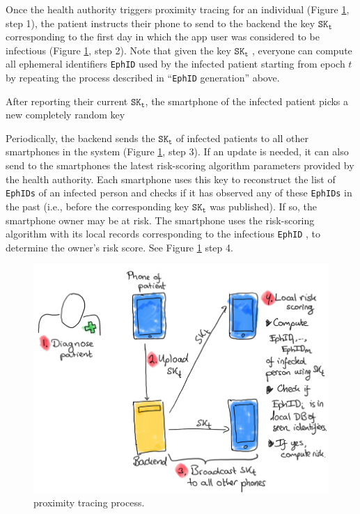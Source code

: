\documentclass[10.8pt,a4paper]{article}
\begin{document}
Once the health authority triggers proximity tracing for an individual (Figure \ref{PT}, step 1), the patient instructs their phone to send to the backend the key $\texttt{SK}_\texttt{t}$ corresponding to the first day in which the app user was considered to be infectious (Figure \ref{PT}, step 2). Note that given the key $\texttt{SK}_\texttt{t}$ , everyone can compute all ephemeral identifiers \texttt{EphID} used by the infected patient starting from epoch $t$ by repeating the process described in “\texttt{EphID} generation” above.

After reporting their current $\texttt{SK}_\texttt{t}$, the smartphone of the infected patient picks a new completely random key

Periodically, the backend sends the $\texttt{SK}_\texttt{t}$ of infected patients to all other smartphones in the system (Figure \ref{PT}, step 3). If an update is needed, it can also send to the smartphones the latest risk-scoring algorithm parameters provided by the health authority. Each smartphone uses this key to reconstruct the list of \texttt{EphIDs} of an infected person and checks if it has observed any of these \texttt{EphIDs} in the past (i.e., before the corresponding key $\texttt{SK}_\texttt{t}$ was published). If so, the smartphone owner may be at risk. The smartphone uses the risk-scoring algorithm with its local records corresponding to the infectious \texttt{EphID} , to determine the owner’s risk score. See Figure \ref{PT} step 4.

\begin{figure}[H]
\centering
\includegraphics[scale=0.65]{fig/PT}
\caption{proximity tracing process.}
\label{PT}
\end{figure}
\end{document}
